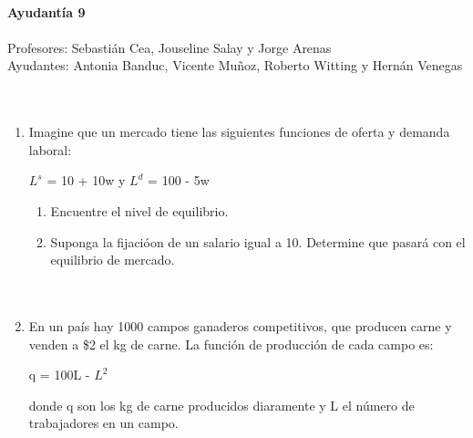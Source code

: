 \documentclass[11pt,letterpaper]{article}
\begin{document}
\begin{center}
    \textbf{\Large{ }}\\
    \textbf{\Large{Ayudantía 9}}\\
    \textbf{\Large{ }}\\
    Profesores: Sebastián Cea, Jouseline Salay y Jorge Arenas\\
    Ayudantes: Antonia Banduc, Vicente Muñoz, Roberto Witting y Hernán Venegas\\
    \textbf{\Large{ }}\\
    \textbf{\Large{ }}\\
\end{center}

\begin{enumerate}

\item Imagine que un mercado tiene las siguientes funciones de oferta y demanda laboral:

\begin{center}
$L^s$ = 10 + 10w y $L^d$ = 100 - 5w\\
\end{center}

\begin{enumerate}
\item Encuentre el nivel de equilibrio.\\

\item Suponga la fijacióon de un salario igual a 10. Determine que pasará con el equilibrio de mercado.\\
\textbf{\Large{ }}\\
\textbf{\Large{ }}\\
\end{enumerate}
 
 
\item En un país hay 1000 campos ganaderos competitivos, que producen carne y venden a \$2 el kg de carne. La función de producción de cada campo es:
    
\begin{center}
q = 100L - $L^2$\\
\end{center}  
    
donde q son los kg de carne producidos diaramente y L el número de trabajadores en un campo.   \\ 
    

\end{enumerate}
\end{document}
